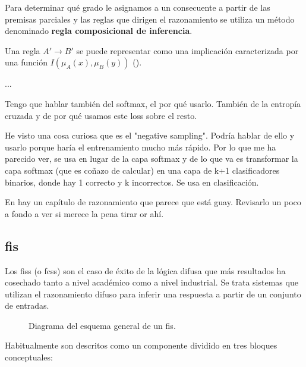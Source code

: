Para determinar qué grado le asignamos a un consecuente a partir de las premisas parciales y las reglas que dirigen el razonamiento se utiliza un método denominado \textbf{regla composicional de inferencia}.

Una regla $A' \rightarrow B'$ se puede representar como una implicación caracterizada por una función $I(\mu_A(x), \mu_B(y))$ (\cite{Fuller1993}).


...

Tengo que hablar también del softmax, el por qué usarlo. También de la entropía cruzada y de por qué usamos este loss sobre el resto.

He visto una cosa curiosa que es el "negative sampling". Podría hablar de ello y usarlo porque haría el entrenamiento mucho más rápido. Por lo que me ha parecido ver, se usa en lugar de la capa softmax y de lo que va es transformar la capa softmax (que es coñazo de calcular) en una capa de k+1 clasificadores binarios, donde hay 1 correcto y k incorrectos. Se usa en clasificación.

En \cite{Ma2004} hay un capítulo de razonamiento que parece que está guay. Revisarlo un poco a fondo a ver si merece la pena tirar or ahí.

\subsection{\gls{fis}}

Los \glspl{fis} (o \glspl{fcs}) son el caso de éxito de la lógica difusa que más resultados ha cosechado tanto a nivel académico como a nivel industrial. Se trata sistemas que utilizan el razonamiento difuso para inferir una respuesta a partir de un conjunto de entradas.

\begin{figure}
	\caption[Diagrama general de un \gls{fis}]{Diagrama del esquema general de un \gls{fis}.}
	\label{fig:fis-general-schema}
\end{figure}

Habitualmente son descritos como un componente dividido en tres bloques conceptuales:

